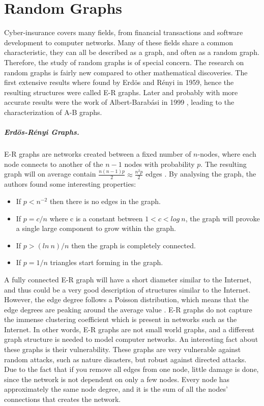 \section{Random Graphs}
Cyber-insurance covers many fields, from financial transactions and software development to computer networks. Many of these fields share a common characteristic, they can all be described as a graph, and often as a random graph. Therefore, the study of random graphs is of special concern. The research on random graphs is fairly new compared to other mathematical discoveries. The first extensive results where found by Erdös and Rényi in 1959, hence the resulting structures were called  E-R graphs. Later and probably with more accurate results were the work of Albert-Barabási in 1999 \cite{audestad}, leading to the characterization of A-B graphs. 
\subparagraph{Erdös-Rényi Graphs.}
E-R graphs are networks created between a fixed number of $n$-nodes, where each node connects to another of the $n-1$ nodes with 
probability $p$. The resulting graph will on average contain $\frac{n(n-1)p}{2} \approx \frac{n^{2}p}{2}$ edges \cite{barabasi}. 
By analysing the graph, the authors found some interesting properties:

\begin{itemize}
\item If $p<n^{-2}$  then there is no edges in the graph. 
\item If $p=c/n$ where c is a constant between $1 < c < log\: n$, the graph will provoke a single large component to grow within the graph.
\item If $p>(ln\: n)/n$ then the graph is completely connected. 
\item If $p = 1/n$ triangles start forming in the graph. 
\end{itemize}

A fully connected E-R graph will have a short diameter similar to the Internet, and thus could be a very good description of structures similar to the Internet. However, the edge degree follows a Poisson distribution, which means that the edge degrees are peaking around the average value \cite{audestad}. E-R graphs do not capture the immense clustering coefficient which is present in networks such as the Internet. In other words, E-R graphs are not small world graphs, and a different graph structure is needed to model computer networks.
An interesting fact about these graphs is their vulnerability. These graphs are very vulnerable against random attacks, such as nature disasters, but robust against directed attacks. Due to the fact that if you remove all edges from one node, little damage is done, since the network is not dependent on only a few nodes. Every node has approximately the same node degree, and it is the sum of all the nodes' connections that creates the network.

